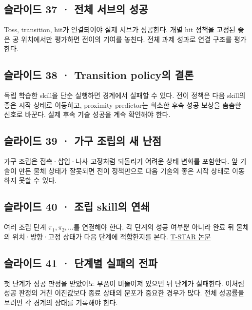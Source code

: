 \documentclass[11pt,a4paper]{article}
\begin{document}
\subsection{슬라이드 37 · 전체 서브의 성공}

Toss, transition, hit가 연결되어야 실제 서브가 성공한다. 개별 hit 정책을 고정된 좋은 공 위치에서만 평가하면 전이의 기여를 놓친다. 전체 과제 성과로 연결 구조를 평가한다.\par

\subsection{슬라이드 38 · Transition policy의 결론}

독립 학습한 skill을 단순 실행하면 경계에서 실패할 수 있다. 전이 정책은 다음 skill의 좋은 시작 상태로 이동하고, proximity predictor는 희소한 후속 성공 보상을 촘촘한 신호로 바꾼다. 실제 후속 기술 성공을 계속 확인해야 한다.\par

\subsection{슬라이드 39 · 가구 조립의 새 난점}

가구 조립은 접촉·삽입·나사 고정처럼 되돌리기 어려운 상태 변화를 포함한다. 앞 기술이 만든 물체 상태가 잘못되면 전이 정책만으로 다음 기술의 좋은 시작 상태로 이동하지 못할 수 있다.\par

\subsection{슬라이드 40 · 조립 skill의 연쇄}

여러 조립 단계 $\pi_1,\pi_2,\ldots$를 연결해야 한다. 각 단계의 성공 여부뿐 아니라 완료 뒤 물체의 위치·방향·고정 상태가 다음 단계에 적합한지를 본다. \href{https://arxiv.org/abs/2111.07999}{T-STAR 논문}\par

\subsection{슬라이드 41 · 단계별 실패의 전파}

첫 단계가 성공 판정을 받았어도 부품이 비뚤어져 있으면 뒤 단계가 실패한다. 이처럼 성공 판정의 거친 이진값보다 종료 상태의 분포가 중요한 경우가 많다. 전체 성공률을 보려면 각 경계의 상태를 기록해야 한다.\par
\end{document}
